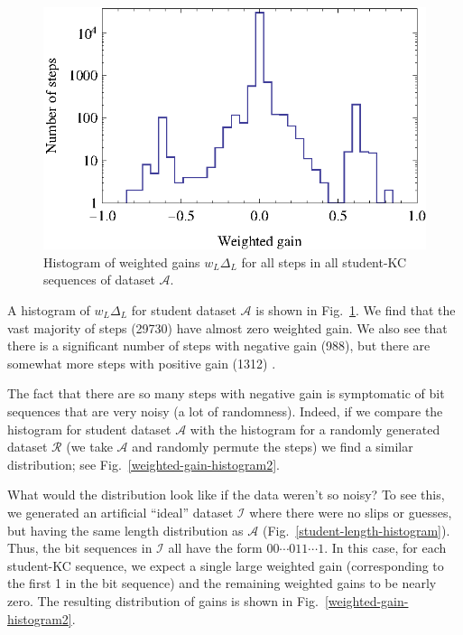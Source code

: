 \documentclass{edm_template}
\begin{document}
\begin{figure}
  \centering \includegraphics{weighted-gain-histogram.eps}
   \caption{Histogram of weighted gains $w_L \Delta_L$ for
     all steps in all student-KC sequences of dataset $\mathcal{A}$.}
    \label{weighted-gain-histogram}
\end{figure}

A histogram of $w_L
\Delta_L$ for student dataset $\mathcal{A}$ is shown in
Fig.~\ref{weighted-gain-histogram}.  We find that the vast majority of
steps (29730) have almost zero weighted gain.  We also see that there
is a significant number of steps with negative gain (988), but there
are somewhat more steps with positive gain (1312) .

The fact that there are so many steps with negative gain is
symptomatic of bit sequences that are very noisy (a lot of
randomness).  Indeed, if we compare the histogram for student
dataset $\mathcal{A}$ with the histogram for a randomly 
generated dataset $\mathcal{R}$ (we take $\mathcal{A}$ and
randomly permute the steps) we find a similar distribution;
see Fig.~\ref{weighted-gain-histogram2}.

What would the distribution look like if the data weren't 
so noisy?  To see this, we generated an artificial ``ideal'' dataset
$\mathcal{I}$ where there were no slips or guesses, but having
the same length distribution as $\mathcal{A}$ 
(Fig.~\ref{student-length-histogram}).  Thus, the bit sequences
in $\mathcal{I}$ all have the form $00\cdots011\cdots1$.
In this case, for each student-KC sequence, we expect a single 
large weighted gain (corresponding to the first 1 in the bit sequence) 
and the remaining weighted gains to be nearly zero.  The resulting 
distribution of gains is shown
in  Fig.~\ref{weighted-gain-histogram2}.
\end{document}
